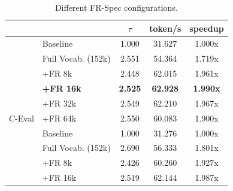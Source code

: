 \documentclass{article} %
\begin{document}
\begin{table}[htbp]
\centering
\caption{Different FR-Spec configurations.}
\label{tab:fr}
\begin{tabular}{clccc}
\toprule
\multicolumn{1}{l}{}       &                                          & \textbf{$\tau$}                             & \textbf{token/s}                        & \textbf{speedup}                       \\ \midrule
                           & Baseline                                 & 1.000                                  & 31.627                                  & 1.000x                                  \\
                           & Full Vocab. (152k)                    & 2.551                                  & 54.364                                  & 1.719x                                  \\
                           & +FR 8k                                   & 2.448                                  & 62.015                                  & 1.961x                                  \\
                           & \cellcolor[HTML]{E5F6FF}\textbf{+FR 16k} & \cellcolor[HTML]{E5F6FF}\textbf{2.525} & \cellcolor[HTML]{E5F6FF}\textbf{62.928} & \cellcolor[HTML]{E5F6FF}\textbf{1.990x} \\
                           & +FR 32k                                  & 2.549                                  & 62.210                                  & 1.967x                                  \\ 
\multirow{-6}{*}{C-Eval}   & +FR 64k                                  & 2.550                                  & 60.083                                  & 1.900x                                  \\ \midrule
                           & Baseline                                 & 1.000                                  & 31.276                                  & 1.000x                                  \\
                           & Full Vocab. (152k)                    & 2.690                                  & 56.333                                  & 1.801x                                  \\
                           & +FR 8k                                   & 2.426                                  & 60.260                                  & 1.927x                                  \\
                           & +FR 16k                                  & 2.519                                  & 62.144                                  & 1.987x                                  \\

\end{tabular}
\end{table}
\end{document}
